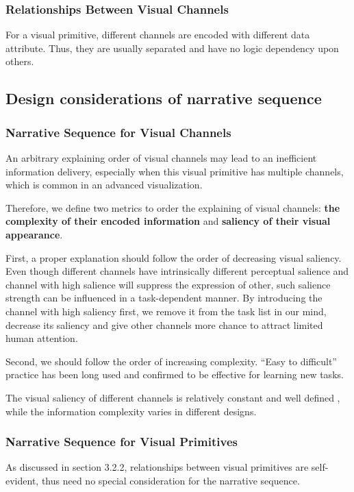 \subsubsection{Relationships Between Visual Channels}
For a visual primitive, different channels are encoded with different data attribute. Thus, they are usually separated and have no logic dependency upon others. 

\subsection{Design considerations of narrative sequence}


\subsubsection{Narrative Sequence for Visual Channels}

An arbitrary explaining order of visual channels may lead to an inefficient information delivery, especially when this visual primitive has multiple channels, which is common in an advanced visualization. 

Therefore, we define two metrics to order the explaining of visual channels: \textbf{the complexity of their encoded information} and \textbf{saliency of their visual appearance}.

First, a proper explanation should follow the order of decreasing visual saliency.\cite{cleveland_graphical_1984} Even though different channels have intrinsically different perceptual salience and channel with high salience will suppress the expression of other, such salience strength can be influenced in a task-dependent manner. \cite{nothdurft_salience_2000} By introducing the channel with high saliency first, we remove it from the task list in our mind\cite{itti2001computational}, decrease its saliency and give other channels more chance to attract limited human attention. 

 Second, we should follow the order of increasing complexity. “Easy to difficult” practice has been long used and confirmed to be effective for learning new tasks\cite{bliss_effects_1992}.
 
The visual saliency of different channels is relatively constant and  well defined \cite{munzner_visualization_2014,cleveland_graphical_1984}, while the information complexity varies in different designs. 

\subsubsection{Narrative Sequence for Visual Primitives}
As discussed in section 3.2.2, relationships between visual primitives are self-evident, thus need no special consideration for the narrative sequence. 

